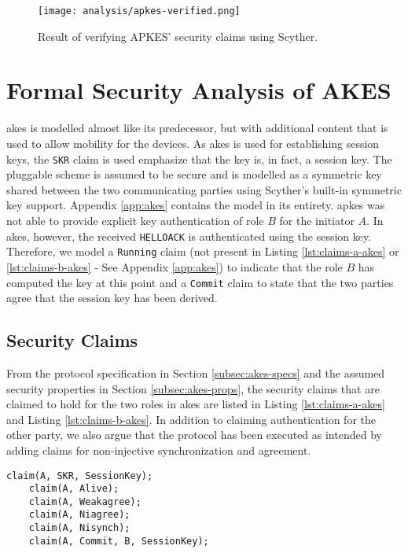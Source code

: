 \begin{figure}[h]
	\centering
	\texttt{[image: analysis/apkes-verified.png]}
	\caption{Result of verifying APKES' security claims using Scyther.}
	\label{fig:apkes-verified}
\end{figure}



\section{Formal Security Analysis of AKES}
\label{sec:akes-analysis}

\gls{akes} is modelled almost like its predecessor, but with additional content that is used to allow mobility for the devices. As \gls{akes} is used for establishing session keys, the \texttt{SKR} claim is used emphasize that the key is, in fact, a session key. The pluggable scheme is assumed to be secure and is modelled as a symmetric key shared between the two communicating parties using Scyther's built-in symmetric key support. Appendix \ref{app:akes} contains the model in its entirety. \gls{apkes} was not able to provide explicit key authentication of role $B$ for the initiator $A$. In \gls{akes}, however, the received \texttt{HELLOACK} is authenticated using the session key. Therefore, we model a \texttt{Running} claim (not present in Listing \ref{lst:claims-a-akes} or \ref{lst:claims-b-akes} - See Appendix \ref{app:akes}) to indicate that the role $B$ has computed the key at this point and a \texttt{Commit} claim to state that the two parties agree that the session key has been derived.

\subsection{Security Claims}

From the protocol specification in Section \ref{subsec:akes-specs} and the assumed security properties in Section \ref{subsec:akes-props}, the security claims that are claimed to hold for the two roles in \gls{akes} are listed in Listing \ref{lst:claims-a-akes} and Listing \ref{lst:claims-b-akes}. In addition to claiming authentication for the other party, we also argue that the protocol has been executed as intended by adding claims for non-injective synchronization and agreement.\\

\begin{lstlisting}[caption={Security claims for role A in AKES.}, label={lst:claims-a-akes}, style=code-listings]
	claim(A, SKR, SessionKey);
	claim(A, Alive);
	claim(A, Weakagree);
	claim(A, Niagree);
	claim(A, Nisynch);
	claim(A, Commit, B, SessionKey);
\end{lstlisting}


